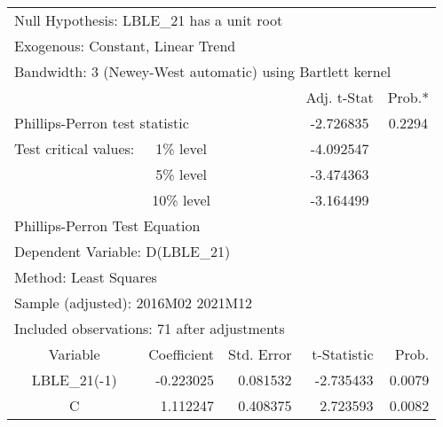 \begin{tabular}{lrrrr}
\toprule
\multicolumn{3}{l}{Null Hypothesis: LBLE\_21 has a unit root}&\multicolumn{1}{c}{}&\multicolumn{1}{c}{}\\
\multicolumn{3}{l}{Exogenous: Constant, Linear Trend}&\multicolumn{1}{c}{}&\multicolumn{1}{c}{}\\
\multicolumn{5}{l}{Bandwidth: 3 (Newey-West automatic) using Bartlett kernel}\\
\midrule
\multicolumn{1}{c}{}&\multicolumn{1}{c}{}&\multicolumn{1}{c}{}&\multicolumn{1}{c}{Adj. t-Stat}&\multicolumn{1}{c}{Prob.*}\\
\midrule
\multicolumn{2}{l}{Phillips-Perron test statistic}&\multicolumn{1}{l}{}&\multicolumn{1}{c}{-2.726835}&\multicolumn{1}{c}{0.2294}\\
\multicolumn{1}{l}{Test critical values:}&\multicolumn{1}{c}{1\% level}&\multicolumn{1}{c}{}&\multicolumn{1}{c}{-4.092547}&\multicolumn{1}{c}{}\\
\multicolumn{1}{c}{}&\multicolumn{1}{c}{5\% level}&\multicolumn{1}{c}{}&\multicolumn{1}{c}{-3.474363}&\multicolumn{1}{c}{}\\
\multicolumn{1}{c}{}&\multicolumn{1}{c}{10\% level}&\multicolumn{1}{c}{}&\multicolumn{1}{c}{-3.164499}&\multicolumn{1}{c}{}\\
\midrule
\multicolumn{2}{l}{Phillips-Perron Test Equation}&\multicolumn{1}{c}{}&\multicolumn{1}{c}{}&\multicolumn{1}{c}{}\\
\multicolumn{3}{l}{Dependent Variable: D(LBLE\_21)}&\multicolumn{1}{c}{}&\multicolumn{1}{c}{}\\
\multicolumn{2}{l}{Method: Least Squares}&\multicolumn{1}{c}{}&\multicolumn{1}{c}{}&\multicolumn{1}{c}{}\\
\multicolumn{3}{l}{Sample (adjusted): 2016M02 2021M12}&\multicolumn{1}{c}{}&\multicolumn{1}{c}{}\\
\multicolumn{4}{l}{Included observations: 71 after adjustments}&\multicolumn{1}{c}{}\\
\midrule
\multicolumn{1}{c}{Variable}&\multicolumn{1}{r}{Coefficient}&\multicolumn{1}{r}{Std. Error}&\multicolumn{1}{r}{t-Statistic}&\multicolumn{1}{r}{Prob.}\\
\midrule
\multicolumn{1}{c}{LBLE\_21(-1)}&\multicolumn{1}{r}{-0.223025}&\multicolumn{1}{r}{0.081532}&\multicolumn{1}{r}{-2.735433}&\multicolumn{1}{r}{0.0079}\\
\multicolumn{1}{c}{C}&\multicolumn{1}{r}{1.112247}&\multicolumn{1}{r}{0.408375}&\multicolumn{1}{r}{2.723593}&\multicolumn{1}{r}{0.0082}\\

\end{tabular}
